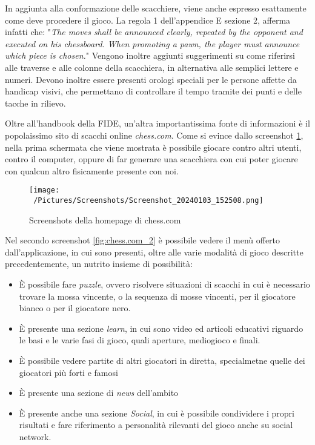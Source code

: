 \documentclass[12pt]{book}
\begin{document}
In aggiunta alla conformazione delle scacchiere, viene anche espresso
esattamente come deve procedere il gioco. La regola 1 dell'appendice E
sezione 2, afferma infatti che: "\textit{The moves shall be announced clearly, repeated by the opponent and executed on his
chessboard. When promoting a pawn, the player must announce which piece is
chosen.}" Vengono inoltre aggiunti suggerimenti su come riferirsi alle
traverse e alle colonne della scacchiera, in alternativa alle semplici
lettere e numeri. Devono inoltre essere presenti orologi speciali per
le persone affette da handicap visivi, che permettano di controllare
il tempo tramite dei punti e delle tacche in rilievo.

Oltre all'handbook della FIDE, un'altra importantissima fonte di
informazioni è il popolaissimo sito di scacchi online
\textit{chess.com}. Come si evince dallo screenshot
\ref{fig:chess.com_1}, nella prima schermata che viene mostrata è
possibile giocare contro altri utenti, contro il computer, oppure di
far generare una scacchiera con cui poter giocare con qualcun altro
fisicamente presente con noi.

\begin{figure}[h]
  \caption{Screenshots della homepage di chess.com}
  \centering
  \label{fig:chess.com_1}
  \texttt{[image: ~/Pictures/Screenshots/Screenshot\_20240103\_152508.png]}
\end{figure} 

Nel secondo screenshot \ref{fig:chess.com_2} è possibile vedere il
menù offerto dall'applicazione, in cui sono presenti, oltre alle varie
modalità di gioco descritte precedentemente, un nutrito insieme di
possibilità:
\begin{itemize}
  \item È possibile fare \textit{puzzle}, ovvero risolvere
    situazioni di scacchi in cui è necessario trovare la mossa
    vincente, o la sequenza di mosse vincenti, per il giocatore bianco
    o per il giocatore nero.
  \item È presente una sezione \textit{learn}, in cui sono video ed
    articoli educativi riguardo le basi e le varie fasi di gioco,
    quali aperture, mediogioco e finali.
  \item È possibile vedere partite di altri giocatori in diretta,
    specialmetne quelle dei giocatori più forti e famosi
  \item È presente una sezione di \textit{news} dell'ambito
  \item È presente anche una sezione \textit{Social}, in cui è
    possibile condividere i propri risultati e fare riferimento a
    personalità rilevanti del gioco anche su social network.
\end{itemize}
\end{document}
